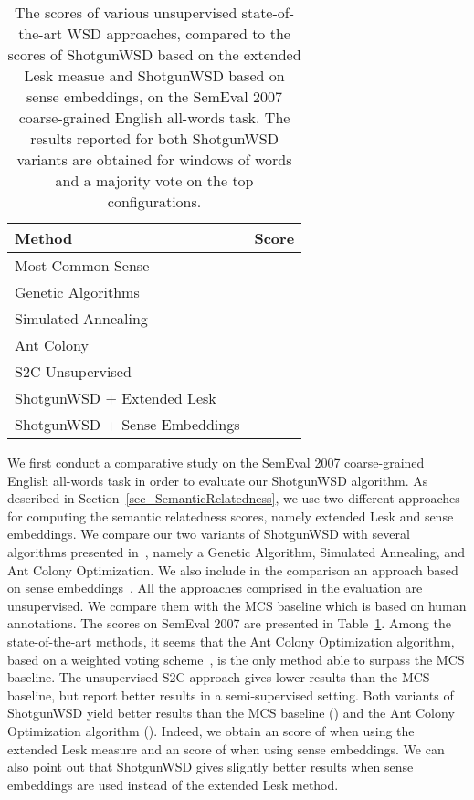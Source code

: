 \documentclass[11pt]{article}
\begin{document}
\begin{table}[h]
\small{
\begin{center}
\begin{tabular}{|l|r|}
\hline
Method 																										&  Score\\
\hline
Most Common Sense																					& \\
Genetic Algorithms~\cite{Schwab-WET-2013} 											& \\
Simulated Annealing~\cite{Schwab-WET-2013} 											& \\
Ant Colony~\cite{Schwab-WET-2013} 														& \\
S2C Unsupervised~\cite{Chen-EMNLP-2014}												& \\
\hline
ShotgunWSD + Extended Lesk																		& \\
ShotgunWSD + Sense Embeddings																& \\
\hline
\end{tabular}
\end{center}
\caption{\label{tab_SemEval2007_Results} The  scores of various unsupervised state-of-the-art WSD approaches, compared to the  scores of ShotgunWSD based on the extended Lesk measue and ShotgunWSD based on sense embeddings, on the SemEval 2007 coarse-grained English all-words task. The results reported for both ShotgunWSD variants are obtained for windows of  words and a majority vote on the top  configurations.}
}
\end{table}

We first conduct a comparative study on the SemEval 2007 coarse-grained English all-words task in order to evaluate our ShotgunWSD algorithm. As described in Section~\ref{sec_SemanticRelatedness}, we use two different approaches for computing the semantic relatedness scores, namely extended Lesk and sense embeddings. We compare our two variants of ShotgunWSD with several algorithms presented in~\cite{Schwab-COLING-2012,Schwab-WET-2013}, namely a Genetic Algorithm, Simulated Annealing, and Ant Colony Optimization. We also include in the comparison an approach based on sense embeddings~\cite{Chen-EMNLP-2014}. All the approaches comprised in the evaluation are unsupervised. We compare them with the MCS baseline which is based on human annotations. The  scores on SemEval 2007 are presented in Table~\ref{tab_SemEval2007_Results}. Among the state-of-the-art methods, it seems that the Ant Colony Optimization algorithm, based on a weighted voting scheme~\cite{Schwab-WET-2013}, is the only method able to surpass the MCS baseline. The unsupervised S2C approach gives lower results than the MCS baseline, but  report better results in a semi-supervised setting. Both variants of ShotgunWSD yield better results than the MCS baseline () and the Ant Colony Optimization algorithm (). Indeed, we obtain an  score of  when using the extended Lesk measure and an  score of  when using sense embeddings. We can also point out that ShotgunWSD gives slightly better results when sense embeddings are used instead of the extended Lesk method.
\end{document}
